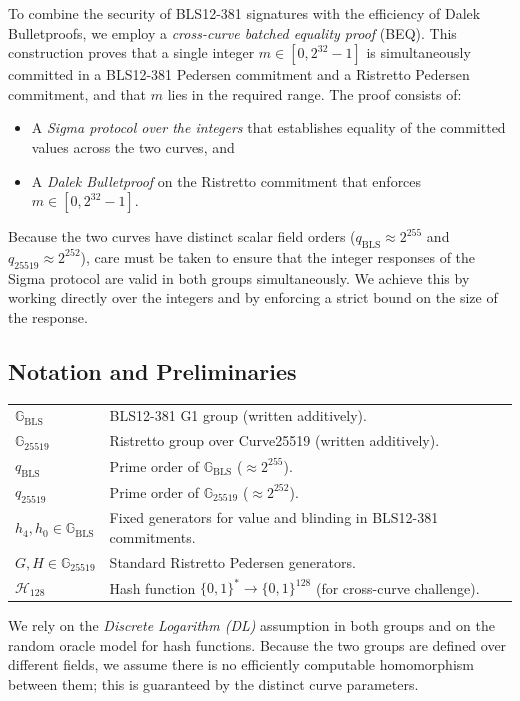 \documentclass[11pt]{article}
\theoremstyle{definitionstyle}
\theoremstyle{plain}
\begin{document}
To combine the security of BLS12-381 signatures with the efficiency of Dalek Bulletproofs, we employ a \emph{cross-curve batched equality proof} (BEQ). This construction proves that a single integer $m \in [0, 2^{32}-1]$ is simultaneously committed in a BLS12-381 Pedersen commitment and a Ristretto Pedersen commitment, and that $m$ lies in the required range. The proof consists of:

\begin{itemize}
\item A \emph{Sigma protocol over the integers} that establishes equality of the committed values across the two curves, and
\item A \emph{Dalek Bulletproof} on the Ristretto commitment that enforces $m \in [0, 2^{32}-1]$.
\end{itemize}

Because the two curves have distinct scalar field orders ($q_{\text{BLS}} \approx 2^{255}$ and $q_{25519} \approx 2^{252}$), care must be taken to ensure that the integer responses of the Sigma protocol are valid in both groups simultaneously. We achieve this by working directly over the integers and by enforcing a strict bound on the size of the response.

\subsection{Notation and Preliminaries}

\begin{tabular}{ll}
$\mathbb{G}_{\text{BLS}}$ & BLS12-381 G1 group (written additively). \\
$\mathbb{G}_{25519}$ & Ristretto group over Curve25519 (written additively). \\
$q_{\text{BLS}}$ & Prime order of $\mathbb{G}_{\text{BLS}}$ ($\approx 2^{255}$). \\
$q_{25519}$ & Prime order of $\mathbb{G}_{25519}$ ($\approx 2^{252}$). \\
$h_4, h_0 \in \mathbb{G}_{\text{BLS}}$ & Fixed generators for value and blinding in BLS12-381 commitments. \\
$G, H \in \mathbb{G}_{25519}$ & Standard Ristretto Pedersen generators. \\
$\mathcal{H}_{128}$ & Hash function $\{0,1\}^* \to \{0,1\}^{128}$ (for cross-curve challenge).
\end{tabular}

We rely on the \emph{Discrete Logarithm (DL)} assumption in both groups and on the random oracle model for hash functions. Because the two groups are defined over different fields, we assume there is no efficiently computable homomorphism between them; this is guaranteed by the distinct curve parameters.
\end{document}
